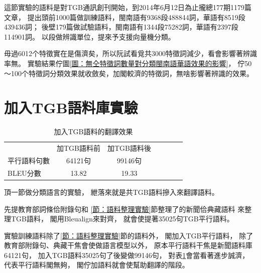 



這節實驗的語料是對TGB通訊創刊開始，到2014年6月12日為止攏總177期1179篇文章，
提出頭前1000篇做訓練語料，閩南語有9368段488844詞，華語有8519段439436詞；
後壁179篇做試驗語料，閩南語有1344段75282詞，華語有2397段114901詞。
以段做辨識單位，提來予支援向量機分類。

毋過6012个特徵實在是傷濟矣，所以阮試看覓共3000特徵詞減少，看會影響著辨識率無。
實驗結果佇圖\ref{圖：無仝特徵詞數量對分類閩南語華語效果的影響}，
佇50～100个特徵詞分類效果就收斂矣，加閣較濟的特徵詞，無啥影響著辨識的效果。

\section{加入TGB語料庫實驗}
\label{節：加入TGB語料庫實驗}

\begin{table}
\caption{加入TGB語料的翻譯效果}
\label{表：加入TGB語料的翻譯效果}
\centering
\begin{tabular}{lcccccc}
& 加TGB語料前 & 加TGB語料後\\
平行語料句數 & 64121句 & 99146句\\
BLEU分數 & 13.82 & 19.33\\
\end{tabular}
\end{table}

頂一節做分類語言的實驗，
紲落來就是共TGB語料摻入來翻譯語料。

先提教育部詞條佮附錄句和
\ref{節：語料整理實驗}節整理了的新聞佮典藏語料
來整理TGB語料，
閣用Bleualign來對齊，
就會使提著35025句TGB平行語料。

實驗訓練語料除了\ref{節：語料整理實驗}節的語料外，
閣加入TGB平行語料，
除了教育部附錄句、典藏干焦會使做語言模型以外，
原本平行語料干焦是新聞語料庫64121句，
加入TGB語料35025句了後變做99146句，
對表\ref{表：加入TGB語料的翻譯效果}會當看著進步誠濟，
代表平行語料閣無夠，
閣佇加語料就會使幫助翻譯的階段。

